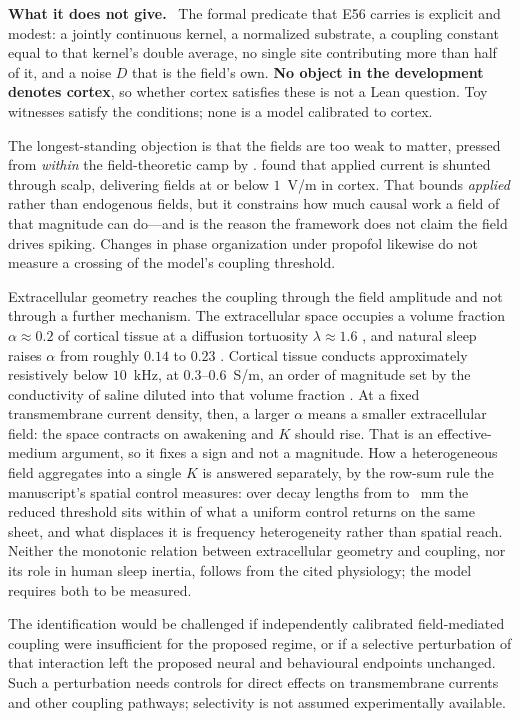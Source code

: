 \documentclass[11pt]{article}
\newcommand{\scope}{\par\smallskip\noindent\textbf{What it does not give.}\ }
\begin{document}
\scope
The formal predicate that E56 carries is explicit and modest: a jointly
continuous kernel, a normalized substrate, a coupling constant equal to that
kernel's double average, no single site contributing more than half of it, and
a noise $D$ that is the field's own. \textbf{No object in the development
denotes cortex}, so whether cortex satisfies these is not a Lean question.
Toy witnesses satisfy the conditions; none is a model calibrated to cortex.

The longest-standing objection is that the fields are too weak to matter,
pressed from \emph{within} the field-theoretic camp by
\citet{pockett2012,pockett2002}. \citet{voroslakos2018} found that applied
current is shunted through scalp, delivering fields at or below $1$~V/m in
cortex. That bounds \emph{applied} rather than endogenous fields, but it
constrains how much causal work a field of that magnitude can do---and is the
reason the framework does not claim the field drives spiking. Changes in phase
organization under propofol \citep{bastos2021} likewise do not measure a
crossing of the model's coupling threshold.

Extracellular geometry reaches the coupling through the field amplitude and not
through a further mechanism. The extracellular space occupies a volume fraction
$\alpha\approx0.2$ of cortical tissue at a diffusion tortuosity $\lambda\approx1.6$
\citep{sykova2008}, and natural sleep raises $\alpha$ from roughly $0.14$ to $0.23$
\citep{xie2013}. Cortical tissue conducts approximately resistively below
$10$~kHz, at $0.3$--$0.6$~S/m, an order of magnitude set by the conductivity of
saline diluted into that volume fraction \citep{barbour2017}. At a fixed
transmembrane current density, then, a larger $\alpha$ means a smaller
extracellular field: the space contracts on awakening and $K$ should rise. That
is an effective-medium argument, so it fixes a sign and not a magnitude. How a
heterogeneous field aggregates into a single $K$ is answered separately, by the
row-sum rule the manuscript's spatial control measures: over decay lengths from
\reductionDecayMin{} to \reductionDecayMax~mm the reduced threshold sits within
\reductionRuleSpread{} of what a uniform control returns on the same sheet, and
what displaces it is frequency heterogeneity rather than spatial reach.
Neither the monotonic relation
between extracellular geometry and coupling, nor its role in human sleep
inertia, follows from the cited physiology; the model requires both to be
measured.

The identification would be challenged if independently calibrated
field-mediated coupling were insufficient for the proposed regime, or if a
selective perturbation of that interaction left the proposed neural and
behavioural endpoints unchanged. Such a perturbation needs controls for direct
effects on transmembrane currents and other coupling pathways; selectivity is
not assumed experimentally available.
\end{document}
